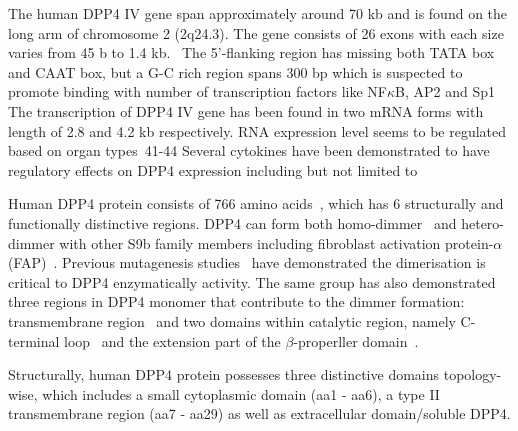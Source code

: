 The human DPP4 IV gene span approximately around 70 kb and is found on the long arm of chromosome 2 (2q24.3). The gene consists of 26 exons with each size varies from 45 b to 1.4 kb.~\cite{Abbott1994} The 5'-flanking region has missing both TATA box and CAAT box, but a G-C rich region spans 300 bp which is suspected to promote binding with number of transcription factors like NF$\kappa$B, AP2 and Sp1~\cite{Abbott1994,Böhm1995} The transcription of DPP4 IV gene has been found in two mRNA forms with length of 2.8 and 4.2 kb respectively. RNA expression level seems to be regulated based on organ types~41-44
Several cytokines have been demonstrated to have regulatory effects on DPP4 expression including but not limited to 
\par
Human DPP4 protein consists of 766 amino acids~\cite{Bär2003,Misumi1992}, which has 6 structurally and functionally distinctive regions. DPP4 can form both homo-dimmer~\cite{Rasmussen2003,Oefner2003,Thoma2003} and hetero-dimmer with other S9b family members including fibroblast activation protein-$\alpha$ (FAP)~\cite{Ghersi2006}. Previous mutagenesis studies~\cite{Chien_2004,Chien_2006} have demonstrated the dimerisation is critical to DPP4 enzymatically activity. The same group has also demonstrated three regions in DPP4 monomer that contribute to the dimmer formation: transmembrane region~\cite{Chung_2010} and two domains within catalytic region, namely C-terminal loop~\cite{Chien_2004} and the extension part of the $\beta$-properller domain~\cite{Chien_2006}.  
\par 
Structurally, human DPP4 protein possesses three distinctive domains topology-wise, which includes a small cytoplasmic domain (aa1 - aa6), a type II transmembrane region (aa7 - aa29) as well as extracellular domain/soluble DPP4. 
\par